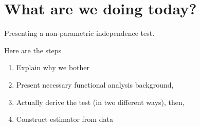 
%
\begin{flushright}
\end{flushright}
	\vspace{-46.5mm}
	{\bfseries\Large{\color{ETHtitleblue}\ETHtitle}}\par
    \vspace{-3.5mm}
    \Large\ETHsubtitle
\clearpage
\vspace*{-16.5mm}
\tableofcontents
\clearpage

\section{What are we doing today?}

Presenting a non-parametric independence test.

Here are the steps

\begin{enumerate}
	\item Explain why we bother
	\item Present necessary functional analysis background,
	\item Actually derive the test (in two different ways), then,
	\item Construct estimator from data
\end{enumerate}

